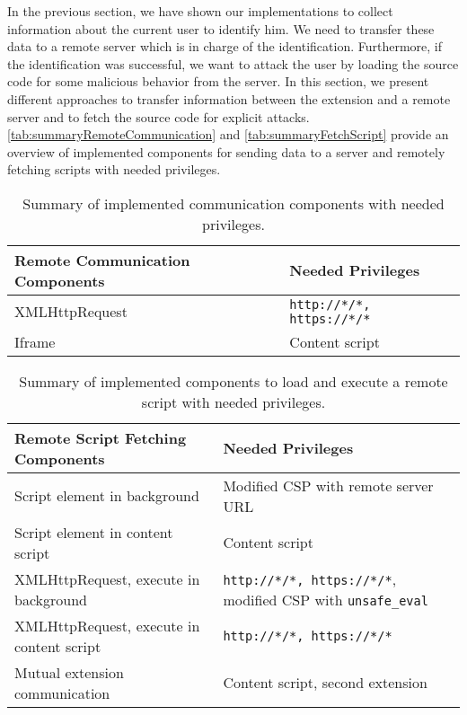 	In the previous section, we have shown our implementations to collect information about the current user to identify him. We need to transfer these data to a remote server which is in charge of the identification. Furthermore, if the identification was successful, we want to attack the user by loading the source code for some malicious behavior from the server. In this section, we present different approaches to transfer information between the extension and a remote server and to fetch the source code for explicit attacks. \autoref{tab:summaryRemoteCommunication} and \autoref{tab:summaryFetchScript} provide an overview of implemented components for sending data to a server and remotely fetching scripts with needed privileges.
	
	\begin{table}[h]
		\centering
		\begin{tabular}{|l|l|} \hline
			\textbf{Remote Communication Components} & \textbf{Needed Privileges} \\ \hline
			XMLHttpRequest & \texttt{http://*/*, https://*/*}  \\
			Iframe & Content script \\	
			\hline
		\end{tabular}
		\caption{Summary of implemented communication components with needed privileges.}
		\label{tab:summaryRemoteCommunication}
	\end{table}
	
	\begin{table}[h]
		\centering
		\begin{tabular}{|l|l|} \hline
			\textbf{Remote Script Fetching Components} & \textbf{Needed Privileges} \\ \hline
			Script element in background & Modified CSP with remote server URL \\
			Script element in content script & Content script \\
			XMLHttpRequest, execute in background & \texttt{http://*/*, https://*/*}, modified CSP with \texttt{unsafe\_eval} \\
			XMLHttpRequest, execute in content script & \texttt{http://*/*, https://*/*}  \\
			Mutual extension communication & Content script, second extension \\ 
			\hline
		\end{tabular}
		\caption{Summary of implemented components to load and execute a remote script with needed privileges.}
		\label{tab:summaryFetchScript}
	\end{table}
	
